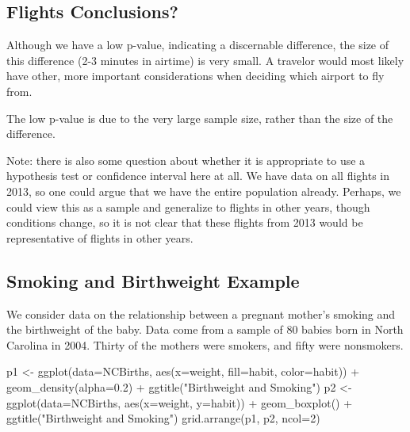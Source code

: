 \documentclass[
  letterpaper,
  DIV=11,
  numbers=noendperiod]{scrreprt}
\newenvironment{Shaded}{\begin{snugshade}}{\end{snugshade}}
\newcommand{\AttributeTok}[1]{\textcolor[rgb]{0.40,0.45,0.13}{#1}}
\newcommand{\DecValTok}[1]{\textcolor[rgb]{0.68,0.00,0.00}{#1}}
\newcommand{\FloatTok}[1]{\textcolor[rgb]{0.68,0.00,0.00}{#1}}
\newcommand{\FunctionTok}[1]{\textcolor[rgb]{0.28,0.35,0.67}{#1}}
\newcommand{\NormalTok}[1]{\textcolor[rgb]{0.00,0.23,0.31}{#1}}
\newcommand{\OtherTok}[1]{\textcolor[rgb]{0.00,0.23,0.31}{#1}}
\newcommand{\SpecialCharTok}[1]{\textcolor[rgb]{0.37,0.37,0.37}{#1}}
\newcommand{\StringTok}[1]{\textcolor[rgb]{0.13,0.47,0.30}{#1}}
\begin{document}
\subsection{Flights Conclusions?}\label{flights-conclusions}

Although we have a low p-value, indicating a discernable difference, the
size of this difference (2-3 minutes in airtime) is very small. A
travelor would most likely have other, more important considerations
when deciding which airport to fly from.

The low p-value is due to the very large sample size, rather than the
size of the difference.

Note: there is also some question about whether it is appropriate to use
a hypothesis test or confidence interval here at all. We have data on
all flights in 2013, so one could argue that we have the entire
population already. Perhaps, we could view this as a sample and
generalize to flights in other years, though conditions change, so it is
not clear that these flights from 2013 would be representative of
flights in other years.

\subsection{Smoking and Birthweight
Example}\label{smoking-and-birthweight-example}

We consider data on the relationship between a pregnant mother's smoking
and the birthweight of the baby. Data come from a sample of 80 babies
born in North Carolina in 2004. Thirty of the mothers were smokers, and
fifty were nonsmokers.

\begin{Shaded}
\begin{Highlighting}[]
\NormalTok{p1 }\OtherTok{\textless{}{-}} \FunctionTok{ggplot}\NormalTok{(}\AttributeTok{data=}\NormalTok{NCBirths, }\FunctionTok{aes}\NormalTok{(}\AttributeTok{x=}\NormalTok{weight, }\AttributeTok{fill=}\NormalTok{habit, }\AttributeTok{color=}\NormalTok{habit)) }\SpecialCharTok{+} \FunctionTok{geom\_density}\NormalTok{(}\AttributeTok{alpha=}\FloatTok{0.2}\NormalTok{) }\SpecialCharTok{+} \FunctionTok{ggtitle}\NormalTok{(}\StringTok{"Birthweight and Smoking"}\NormalTok{)}
\NormalTok{p2 }\OtherTok{\textless{}{-}} \FunctionTok{ggplot}\NormalTok{(}\AttributeTok{data=}\NormalTok{NCBirths, }\FunctionTok{aes}\NormalTok{(}\AttributeTok{x=}\NormalTok{weight, }\AttributeTok{y=}\NormalTok{habit)) }\SpecialCharTok{+} \FunctionTok{geom\_boxplot}\NormalTok{() }\SpecialCharTok{+} \FunctionTok{ggtitle}\NormalTok{(}\StringTok{"Birthweight and Smoking"}\NormalTok{)}
\FunctionTok{grid.arrange}\NormalTok{(p1, p2, }\AttributeTok{ncol=}\DecValTok{2}\NormalTok{)}
\end{Highlighting}
\end{Shaded}
\end{document}
